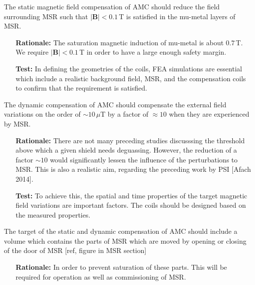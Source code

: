 \begin{RSenumerate}[resume]
\item    The static magnetic field compensation of AMC should reduce the field surrounding MSR such that  $|\mathbf{B}|<0.1\,$T is satisfied in the mu-metal layers of MSR. \label{RS:amc_rs_sta}
\begin{itemize}
    \item[\textbf{Rationale:}]  The saturation magnetic induction of mu-metal is about $ 0.7\,$T. We require $|\mathbf{B}|<0.1\,$T  in order to have a large enough safety margin.
    \item[\textbf{Test:}] In defining the geometries of the coils, FEA simulations are essential which include a realistic background field, MSR, and the compensation coils to confirm that the requirement is satisfied. 
\end{itemize}

 \item The dynamic compensation of AMC should compensate the external field variations on the  order of $\sim 10\,\mu$T by a factor of $\approx 10$ when they are experienced by MSR. \label{RS:amc_rs_dyn}
 \begin{itemize}
    \item[\textbf{Rationale:}] 
    There are not many preceding studies discusssing the threshold above which  a given shield needs deguassing. However, the reduction of a factor $\sim 10$ would significantly lessen the influence of the perturbations to MSR. This is also a realistic aim, regarding the preceding work by PSI [Afach 2014]. 
    \item[\textbf{Test:}] 
    To achieve this, the spatial and time properties of the target magnetic field variations are important factors. The coils should be designed based on the measured properties. 
\end{itemize}

  \item The target of the static and dynamic compensation of AMC should include  a  volume which contains the parts of MSR which are moved by opening or closing of the door of MSR [ref, figure in MSR section]\label{RS:amc_rs_volume}
 \begin{itemize}
    \item[\textbf{Rationale:}] In order to prevent saturation of these parts.  This will be required for operation as well as commissioning of MSR. 
\end{itemize}
\end{RSenumerate}

